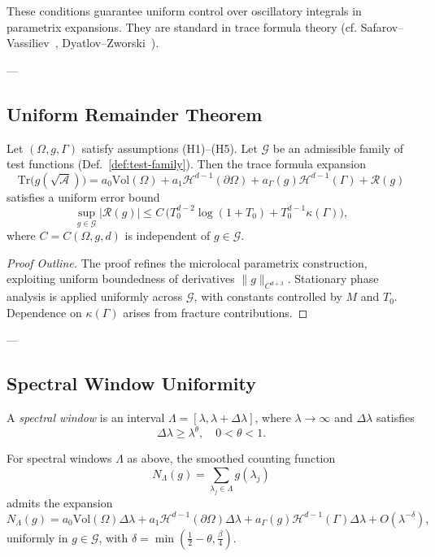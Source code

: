 \begin{remark}
These conditions guarantee uniform control over oscillatory integrals 
in parametrix expansions.  
They are standard in trace formula theory (cf. Safarov–Vassiliev~\cite{SafarovVassiliev1996}, 
Dyatlov–Zworski~\cite{DyatlovZworski2019}).
\end{remark}

---

\subsection{Uniform Remainder Theorem}

\begin{theorem}
\label{thm:uniform}
Let $(\Omega,g,\Gamma)$ satisfy assumptions (H1)--(H5).  
Let $\mathcal{G}$ be an admissible family of test functions 
(Def.~\ref{def:test-family}).  
Then the trace formula expansion
\[
\mathrm{Tr}\big(g(\sqrt{\mathcal{A}})\big) 
= a_0 \mathrm{Vol}(\Omega) 
+ a_1 \mathcal{H}^{d-1}(\partial\Omega) 
+ a_\Gamma(g)\mathcal{H}^{d-1}(\Gamma) 
+ \mathcal{R}(g)
\]
satisfies a uniform error bound
\[
\sup_{g \in \mathcal{G}} |\mathcal{R}(g)| 
\leq C \, \Big( T_0^{d-2}\log(1+T_0) + T_0^{d-1}\kappa(\Gamma) \Big),
\]
where $C = C(\Omega,g,d)$ is independent of $g \in \mathcal{G}$.
\end{theorem}

\begin{proof}[Proof Outline]
The proof refines the microlocal parametrix construction, 
exploiting uniform boundedness of derivatives $\|g\|_{C^{d+3}}$.  
Stationary phase analysis is applied uniformly across $\mathcal{G}$, 
with constants controlled by $M$ and $T_0$.  
Dependence on $\kappa(\Gamma)$ arises from fracture contributions.
\end{proof}

---

\subsection{Spectral Window Uniformity}

\begin{definition}
A \emph{spectral window} is an interval $\Lambda = [\lambda,\lambda+\Delta\lambda]$, 
where $\lambda \to \infty$ and $\Delta\lambda$ satisfies
\[
\Delta\lambda \geq \lambda^\theta, \quad 0 < \theta < 1.
\]
\end{definition}

\begin{theorem}
\label{thm:uniform-window}
For spectral windows $\Lambda$ as above, 
the smoothed counting function
\[
N_\Lambda(g) 
= \sum_{\lambda_j \in \Lambda} g(\lambda_j)
\]
admits the expansion
\[
N_\Lambda(g) 
= a_0 \mathrm{Vol}(\Omega) \Delta\lambda 
+ a_1 \mathcal{H}^{d-1}(\partial\Omega)\Delta\lambda 
+ a_\Gamma(g) \mathcal{H}^{d-1}(\Gamma)\Delta\lambda 
+ O(\lambda^{-\delta}),
\]
uniformly in $g \in \mathcal{G}$, 
with $\delta = \min(\tfrac{1}{2}-\theta,\tfrac{\beta}{4})$.
\end{theorem}

